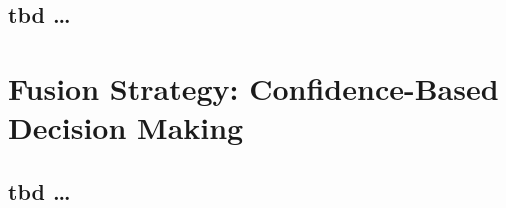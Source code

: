 \subsection{tbd \dots}

\section{Fusion Strategy: Confidence-Based Decision Making}
\subsection{tbd \dots}
